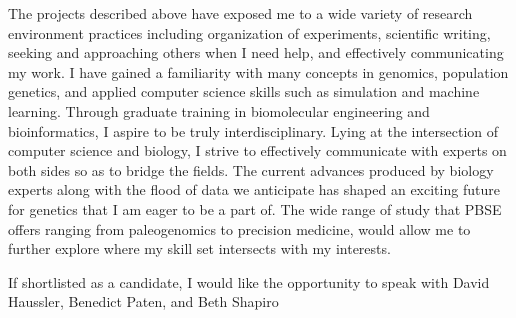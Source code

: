 \documentclass[11pt]{amsart}
\newcommand{\sepspace}{\vspace*{1em}}		%
\begin{document}



The projects described above have exposed me to a wide variety of research environment practices including organization of experiments, scientific writing, seeking and approaching others when I need help, and effectively communicating my work. 
I have gained a familiarity with many concepts in genomics, population genetics, and applied computer science skills such as simulation and machine learning.
Through graduate training in biomolecular engineering and bioinformatics, I aspire to be truly interdisciplinary. 
Lying at the intersection of computer science and biology, I strive to effectively communicate with experts on both sides so as to bridge the fields.  
The current advances produced by biology experts along with the flood of data we anticipate has shaped an exciting future for genetics that I am eager to be a part of. 
The wide range of study that PBSE offers ranging from paleogenomics to precision medicine, would allow me to further explore where my skill set intersects with my interests.
\sepspace

If shortlisted as a candidate, I would like the opportunity to speak with David Haussler, Benedict Paten, and Beth Shapiro
\end{document}
